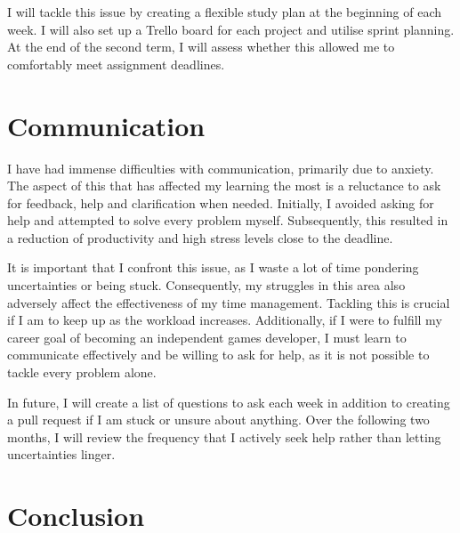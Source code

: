 \documentclass{scrartcl}
\begin{document}
I will tackle this issue by creating a flexible study plan at the beginning of each week. I will also set up a Trello board for each project and utilise sprint planning. At the end of the second term, I will assess whether this allowed me to comfortably meet assignment deadlines.

\section{Communication}
I have had immense difficulties with communication, primarily due to anxiety. The aspect of this that has affected my learning the most is a reluctance to ask for feedback, help and clarification when needed. Initially, I avoided asking for help and attempted to solve every problem myself. Subsequently, this resulted in a reduction of productivity and high stress levels close to the deadline.

It is important that I confront this issue, as I waste a lot of time pondering uncertainties or being stuck. Consequently, my struggles in this area also adversely affect the effectiveness of my time management. Tackling this is crucial if I am to keep up as the workload increases. Additionally, if I were to fulfill my career goal of becoming an independent games developer, I must learn to communicate effectively and be willing to ask for help, as it is not possible to tackle every problem alone.

In future, I will create a list of questions to ask each week in addition to creating a pull request if I am stuck or unsure about anything. Over the following two months, I will review the frequency that I actively seek help rather than letting uncertainties linger.

\section{Conclusion}



\end{document}
